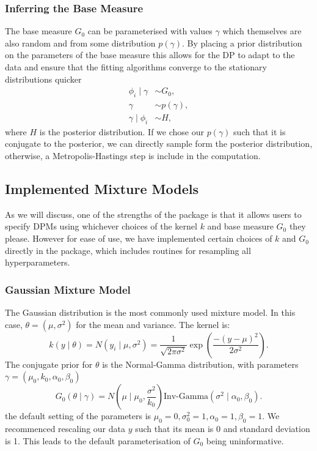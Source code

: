 \documentclass[nojss]{jss}
\begin{document}
\subsubsection{Inferring the Base Measure}

The base measure $G_0$ can be parameterised with values $\gamma$ which themselves are also random and from some distribution $p(\gamma)$. By placing a prior distribution on the parameters of the base measure this allows for the DP to adapt to the data and ensure that the fitting algorithms converge to the stationary distributions quicker
\begin{align*}
\phi _i \mid \gamma & \sim G_0, \\
\gamma & \sim p(\gamma), \\
\gamma \mid \phi _i & \sim H,
\end{align*}
where $H$ is the posterior distribution. If we chose our $p(\gamma)$ such that it is conjugate to the posterior, we can directly sample form the posterior distribution, otherwise, a Metropolis-Hastings step is include in the computation.

\subsection{Implemented Mixture Models} \label{subsec:implemented}
As we will discuss, one of the strengths of the  package is that it allows users to specify DPMs using whichever choices of the kernel $k$ and base measure $G_0$ they please. However for ease of use, we have implemented certain choices of $k$ and $G_0$ directly in the package, which includes routines for resampling all hyperparameters.

\subsubsection{Gaussian Mixture Model}
The Gaussian distribution is the most commonly used mixture model. In this case, $\theta = (\mu,\sigma^2)$ for the mean and variance. The kernel is:
\begin{equation*}
k(y \mid \theta) = N(y_i \mid \mu, \sigma^2) = \frac{1}{\sqrt{2\pi \sigma^2}} \exp \left( \frac{ -(y-\mu)^2}{2\sigma^2} \right).
\end{equation*}
The conjugate prior for $\theta$ is the Normal-Gamma distribution, with parameters $\gamma = (\mu_0, k_0, \alpha_0, \beta_0)$
\begin{equation*}
G_0(\theta \mid \gamma) =  N\left(\mu \mid \mu_0, \frac{\sigma^2}{k_0} \right) \text{Inv-Gamma} \left(\sigma^2 \mid \alpha_0, \beta_0 \right).
\end{equation*}
the default setting of the parameters is $\mu_0 = 0, \sigma _0 ^2 = 1, \alpha _0 = 1, \beta _0 = 1$.
We recommenced rescaling our data $y$ such that its mean is 0 and standard deviation is 1. This leads to the default parameterisation of $G_0$ being uninformative.
\end{document}
